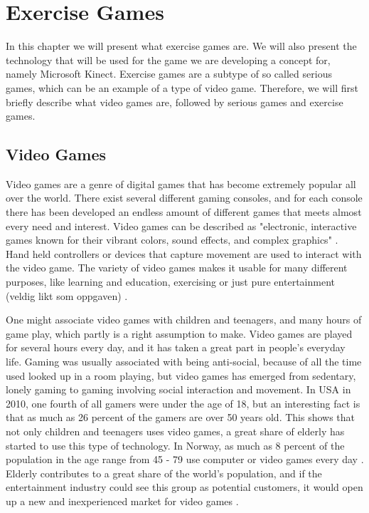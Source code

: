 \chapter{Exercise Games}
In this chapter we will present what exercise games are. We will also present the technology that will be used for the game we are developing a concept for, namely Microsoft Kinect. Exercise games are a subtype of so called serious games, which can be an example of a type of video game. Therefore, we will first briefly describe what video games are, followed by serious games and exercise games. 
\section{Video Games}

Video games are a genre of digital games that has become extremely popular all over the world. There exist several different gaming consoles, and for each console there has been developed an endless amount of different games that meets almost every need and interest. Video games can be described as "electronic, interactive games known for their vibrant colors, sound effects, and complex graphics" \cite{videogamedef}. Hand held controllers or devices that capture movement are used to interact with the video game. The variety of video games makes it usable for many different purposes, like learning and education, exercising or just pure entertainment (veldig likt som oppgaven) \cite{project}. 

One might associate video games with children and teenagers, and many hours of game play, which partly is a right assumption to make. Video games are played for several hours every day, and it has taken a great part in people's everyday life. Gaming was usually associated with being anti-social, because of all the time used looked up in a room playing, but video games has emerged from sedentary, lonely gaming to gaming involving social interaction and movement. In USA in 2010, one fourth of all gamers were under the age of 18, but an interesting fact is that as much as 26 percent of the gamers are over 50 years old. This shows that not only children and teenagers uses video games, a great share of elderly has started to use this type of technology. In Norway,  as much as 8 percent of the population in the age range from 45 - 79 use computer or video games every day \cite{project}. Elderly contributes to a great share of the world's population, and if the entertainment industry could see this group as potential customers, it would open up a new and inexperienced market for video games \cite{ijsselsteijn2007digital}. 

